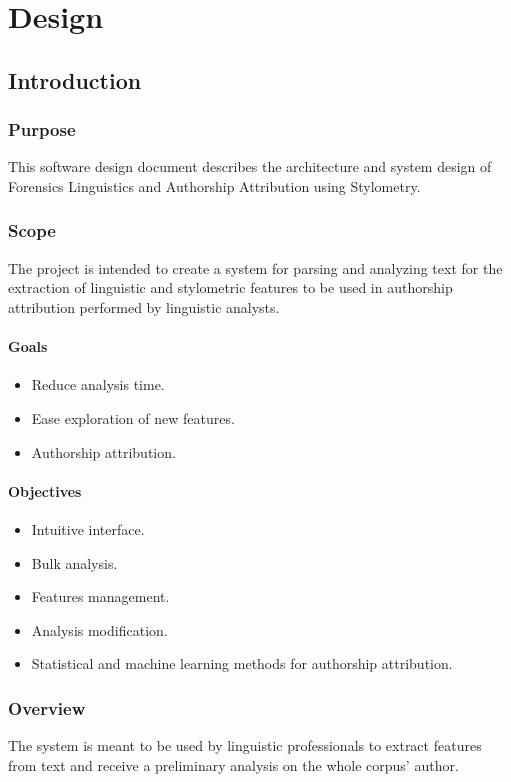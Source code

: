 \chapter{Design}

\section{Introduction}

\subsection{Purpose}
This software design document describes the architecture and system design of Forensics Linguistics and Authorship Attribution using Stylometry.

\subsection{Scope}
The project is intended to create a system for parsing and analyzing text for the extraction of linguistic and stylometric features to be used in authorship attribution performed by linguistic analysts.

\subsubsection{Goals}
\begin{itemize}
    \item Reduce analysis time.
    \item Ease exploration of new features.
    \item Authorship attribution.
\end{itemize}

\subsubsection{Objectives}
\begin{itemize}
    \item Intuitive interface.
    \item Bulk analysis.
    \item Features management.
    \item Analysis modification.
    \item Statistical and machine learning methods for authorship attribution.
\end{itemize}

\subsection{Overview}
The system is meant to be used by linguistic professionals to extract features from text and receive a preliminary analysis on the whole corpus' author.

